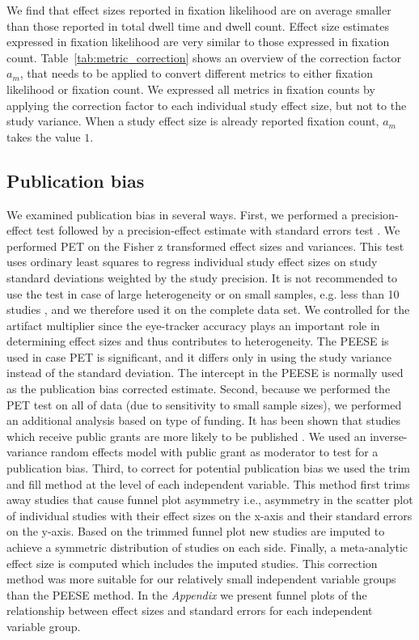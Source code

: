 We find that effect sizes reported in fixation likelihood are on average smaller than those reported in total dwell time and dwell count. Effect size estimates expressed in fixation likelihood are very similar to those expressed in fixation count. Table~\ref{tab:metric_correction} shows an overview of the correction factor $a_m$, that needs to be applied to convert different metrics to either fixation likelihood or fixation count. We expressed all metrics in fixation counts by applying the correction factor to each individual study effect size, but not to the study variance. When a study effect size is already reported fixation count, $a_m$ takes the value $1$.  


\subsection{Publication bias}

We examined publication bias in several ways. First, we performed a precision-effect test followed by a precision-effect estimate with standard errors test \citep[PET-PEESE][]{stanley2014}. We performed PET on the Fisher z transformed effect sizes and variances. This test uses ordinary least squares to regress individual study effect sizes on study standard deviations weighted by the study precision. It is not recommended to use the test in case of large heterogeneity or on small samples, e.g. less than 10 studies \citep{vanaert2019}, and we therefore used it on the complete data set. We controlled for the artifact multiplier since the eye-tracker accuracy plays an important role in determining effect sizes and thus contributes to heterogeneity. The PEESE is used in case PET is significant, and it differs only in using the study variance instead of the standard deviation. The intercept in the PEESE is normally used as the publication bias corrected estimate. Second, because we performed the PET test on all of data (due to sensitivity to small sample sizes), we performed an additional analysis based on type of funding. It has been shown that studies which receive public grants are more likely to be published \citep{canestaro2017}. We used an inverse-variance random effects model with public grant as moderator to test for a publication bias. Third, to correct for potential publication bias we used the trim and fill method \citep{duval2000trim} at the level of each independent variable. This method first trims away studies that cause funnel plot asymmetry i.e., asymmetry in the scatter plot of individual studies with their effect sizes on the x-axis and their standard errors on the y-axis. Based on the trimmed funnel plot new studies are imputed to achieve a symmetric distribution of studies on each side. Finally, a meta-analytic effect size is computed which includes the imputed studies. This correction method was more suitable for our relatively small independent variable groups than the PEESE method. In the \textit{Appendix} we present funnel plots of the relationship between effect sizes and standard errors for each independent variable group.


